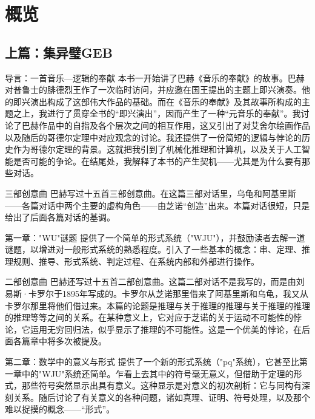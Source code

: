 
\chapter{概览}

\section*{上篇：集异璧GEB}

\begin{overview}

\item[导言：一首音乐—逻辑的奉献]本书一开始讲了巴赫《音乐的奉献》的故事。巴赫对普鲁士的腓德烈王作了一次临时访问，并应邀在国王提出的主题上即兴演奏。他的即兴演出构成了这部伟大作品的基础。而在《音乐的奉献》及其故事所构成的主题之上，我进行了贯穿全书的“即兴演出”，因而产生了一种“元音乐的奉献”。我讨论了巴赫作品中的自指及各个层次之间的相互作用，这又引出了对艾舍尔绘画作品以及随后的哥德尔定理中对应观念的讨论。我还提供了一份简短的逻辑与悖论的历史作为哥德尔定理的背景。这就把我引到了机械化推理和计算机，以及关于人工智能是否可能的争论。在结尾处，我解释了本书的产生契机——尤其是为什么要有那些对话。

\item[三部创意曲]巴赫写过十五首三部创意曲。在这篇三部对话里，乌龟和阿基里斯——各篇对话中两个主要的虚构角色——由芝诺“创造”出来。本篇对话很短，只是给出了后面各篇对话的基调。

\item[第一章："WU"谜题]提供了一个简单的形式系统（"WJU"），并鼓励读者去解一道谜题，以增进对一般形式系统的熟悉程度。引入了一些基本的概念：串、定理、推理规则、推导、形式系统、判定过程、在系统内部和外部进行操作。

\item[二部创意曲]巴赫还写过十五首二部创意曲。这篇二部对话不是我写的，而是由刘易斯·卡罗尔于1895年写成的。卡罗尔从芝诺那里借来了阿基里斯和乌龟，我又从卡罗尔那里将他们借过来。本篇的论题是推理与关于推理的推理与关于推理的推理的推理等等之间的关系。在某种意义上，它对应于芝诺的关于运动不可能性的悖论，它运用无穷回归法，似乎显示了推理的不可能性。这是一个优美的悖论，在后面各篇章中将多次被提及。

\item[第二章：数学中的意义与形式]提供了一个新的形式系统（"pq"系统），它甚至比第一章中的"WJU"系统还简单。乍看上去其中的符号毫无意义，但借助于定理的形式，那些符号突然显示出具有意义。这种显示是对意义的初次剖析：它与同构有深刻关系。随后讨论了有关意义的各种问题，诸如真理、证明、符号处理，以及那个难以捉摸的概念——“形式”。


\end{overview}

